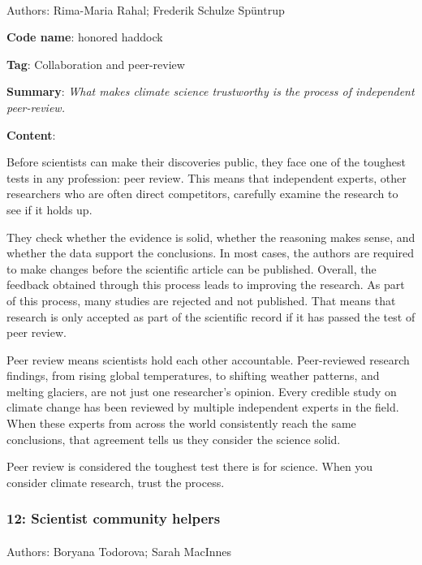 \documentclass[
  letterpaper,
  DIV=11,
  numbers=noendperiod]{scrartcl}
\makeatletter
\let\oldparagraph\paragraph
\renewcommand{\paragraph}{
    \@ifstar
      \xxxParagraphStar
      \xxxParagraphNoStar
  }
\newcommand{\xxxParagraphStar}[1]{\oldparagraph*{#1}\mbox{}}
\newcommand{\xxxParagraphNoStar}[1]{\oldparagraph{#1}\mbox{}}
\makeatother
\begin{document}
\paragraph{Authors: Rima-Maria Rahal; Frederik Schulze
Spüntrup}\label{authors-rima-maria-rahal-frederik-schulze-spuxfcntrup}

\textbf{Code name}: honored haddock

\textbf{Tag}: Collaboration and peer-review

\textbf{Summary}: \emph{What makes climate science trustworthy is the
process of independent peer-review.}

\textbf{Content}:

Before scientists can make their discoveries public, they face one of
the toughest tests in any profession: peer review. This means that
independent experts, other researchers who are often direct competitors,
carefully examine the research to see if it holds up.

They check whether the evidence is solid, whether the reasoning makes
sense, and whether the data support the conclusions. In most cases, the
authors are required to make changes before the scientific article can
be published. Overall, the feedback obtained through this process leads
to improving the research. As part of this process, many studies are
rejected and not published. That means that research is only accepted as
part of the scientific record if it has passed the test of peer review.

Peer review means scientists hold each other accountable. Peer-reviewed
research findings, from rising global temperatures, to shifting weather
patterns, and melting glaciers, are not just one researcher's opinion.
Every credible study on climate change has been reviewed by multiple
independent experts in the field. When these experts from across the
world consistently reach the same conclusions, that agreement tells us
they consider the science solid.

Peer review is considered the toughest test there is for science. When
you consider climate research, trust the process.

\subsubsection{12: Scientist community
helpers}\label{scientist-community-helpers}

\paragraph{Authors: Boryana Todorova; Sarah
MacInnes}\label{authors-boryana-todorova-sarah-macinnes}
\end{document}

